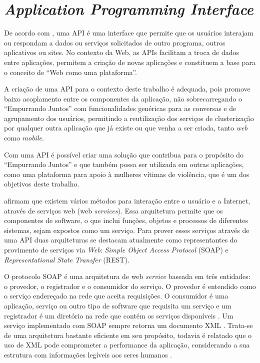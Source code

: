 \chapter{\textit{Application Programming Interface}} \label{cap:api}

De acordo com , uma API é uma interface que permite que os 
usuários interajam ou respondam a dados ou serviços solicitados de outro programa, outros
aplicativos ou sites. No contexto da Web, as APIs facilitam a troca de dados entre 
aplicações, permitem a criação de novas aplicações e constituem a base para o conceito de 
``Web como uma plataforma''.

A criação de uma API para o contexto deste trabalho é adequada, pois promove baixo acoplamento
entre os componentes da aplicação, não sobrecarregando o ``Empurrando Juntos'' com funcionalidades genéricas
para as conversas e de agrupamento dos usuários,
permitindo a reutilização dos serviços de clusterização por qualquer
outra aplicação que já existe ou que venha a ser criada, tanto \textit{web} como \textit{mobile}.

Com uma API é possível criar uma solução que contribua para o propósito do ``Empurrando Juntos'' e que também
possa ser utilizada em outras aplicações, como uma plataforma para apoio à mulheres vítimas de violência, que é
um dos objetivos deste trabalho.

 afirmam que existem vários métodos para interação entre o  
usuário e a Internet, através de serviços web (web \textit{services}).
Essa arquitetura permite que os componentes de software, o que inclui funções,
objetos e processos de diferentes sistemas, sejam expostos como um serviço. Para prover esses serviços através de uma API duas arquiteturas se destacam atualmente como representantes do provimento
de serviços via \textit{Web}: \textit{Simple Object Access Protocol} (SOAP) e \textit{Representational State Transfer} (REST).

O protocolo SOAP é uma arquitetura de web \textit{service} baseada em três entidades: o provedor, o registrador e o consumidor do serviço.
O provedor é entendido como o serviço endereçado na rede
que aceita requisições. O consumidor é uma aplicação, serviço ou outro tipo de software que
requisita um serviço e um registrador é um diretório na rede que contém os serviços disponíveis \cite{mumbaikar}.
Um serviço implementado com SOAP sempre retorna um documento XML \cite{wagh2012comparative}. Trata-se de uma arquitetura 
bastante eficiente em seu propósito, 
todavia é relatado que o uso de XML pode comprometer a performance da aplicação, considerando a sua estrutura com informações 
legíveis aos seres humanos \cite{wagh2012comparative, soap_and_ws}.

